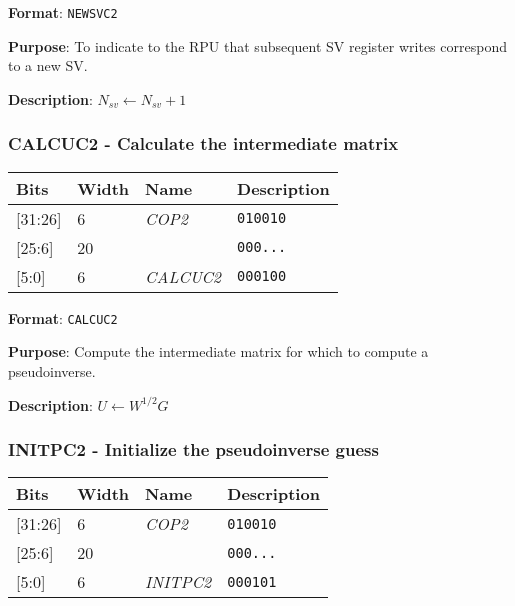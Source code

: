 \documentclass[11pt]{article}
\begin{document}
\textbf{Format}: \texttt{NEWSVC2}

\textbf{Purpose}: To indicate to the RPU that subsequent SV register writes correspond to a new SV.

\textbf{Description}: $N_{sv} \leftarrow N_{sv} + 1$

\text{}
\subsubsection{CALCUC2 - Calculate the intermediate matrix}
\text{}

\begin{table}[H] \centering
  \def\arraystretch{1.4}
  \begin{tabular}{|m{2cm}|m{1.5cm}|m{2.5cm}|m{4.5cm}|}
    \hline
    \textbf{Bits} & \textbf{Width} & \textbf{Name} & \textbf{Description}\\ \hline

    [31:26] & 6 & \emph{COP2} & \texttt{010010}\\ \hline

    [25:6] & 20 & & \texttt{000...}\\ \hline

    [5:0] & 6 & \emph{CALCUC2} & \texttt{000100}\\ \hline
  \end{tabular}
\end{table}

\textbf{Format}: \texttt{CALCUC2}

\textbf{Purpose}: Compute the intermediate matrix for which to compute a pseudoinverse.

\textbf{Description}: $U \leftarrow W^{1/2} G$

\text{}
\subsubsection{INITPC2 - Initialize the pseudoinverse guess}
\text{}

\begin{table}[H] \centering
  \def\arraystretch{1.4}
  \begin{tabular}{|m{2cm}|m{1.5cm}|m{2.5cm}|m{4.5cm}|}
    \hline
    \textbf{Bits} & \textbf{Width} & \textbf{Name} & \textbf{Description}\\ \hline

    [31:26] & 6 & \emph{COP2} & \texttt{010010}\\ \hline

    [25:6] & 20 & & \texttt{000...}\\ \hline

    [5:0] & 6 & \emph{INITPC2} & \texttt{000101}\\ \hline
  \end{tabular}
\end{table}
\end{document}
